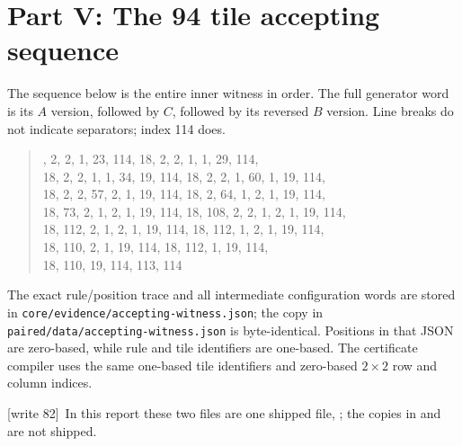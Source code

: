 \documentclass[11pt,letterpaper]{article}
\theoremstyle{definition}
\theoremstyle{remark}
\newcommand{\code}[1]{\nolinkurl{#1}}
\newcommand{\wtagc}{\textup{[write 82]}}
\begin{document}
\section{Part V: The 94 tile accepting sequence}\label{gts:um:app:sequence}
The sequence below is the entire inner witness in order. The full generator word is its $A$ version, followed by $C$, followed by its reversed $B$ version. Line breaks do not indicate separators; index 114 does.
\begin{quote}\small{}, 2, 2, 1, 23, 114, 18, 2, 2, 1, 1, 29, 114,\\
18, 2, 2, 1, 1, 34, 19, 114, 18, 2, 2, 1, 60, 1, 19, 114,\\
18, 2, 2, 57, 2, 1, 19, 114, 18, 2, 64, 1, 2, 1, 19, 114,\\
18, 73, 2, 1, 2, 1, 19, 114, 18, 108, 2, 2, 1, 2, 1, 19, 114,\\
18, 112, 2, 1, 2, 1, 19, 114, 18, 112, 1, 2, 1, 19, 114,\\
18, 110, 2, 1, 19, 114, 18, 112, 1, 19, 114,\\
18, 110, 19, 114, 113, 114
\end{quote}
The exact rule/position trace and all intermediate configuration words are stored in \code{core/evidence/accepting-witness.json}; the copy in \code{paired/data/accepting-witness.json} is byte-identical. Positions in that JSON are zero-based, while rule and tile identifiers are one-based. The certificate compiler uses the same one-based tile identifiers and zero-based $2\times2$ row and column indices.

\wtagc\ In this report these two files are one shipped file, ; the copies in  and  are not shipped.
\end{document}
